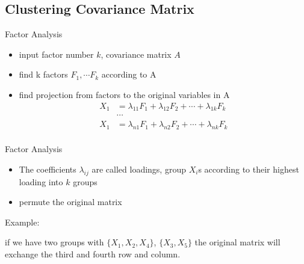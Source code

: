 \documentclass[bigger]{beamer}
\begin{document}
\subsection{Clustering Covariance Matrix}
\begin{frame}[label=sec-5-2-1]{Factor Analysis}
	\label{sec-5-2-1}
	\begin{itemize}
		\item input factor number $k$, covariance matrix $A$
		\item find k factors $F_1, \cdots F_k$ according to A 
		\item find projection from factors to the original variables in A
		\begin{align*}
		X_1&=\lambda_{11}F_1 + \lambda_{12}F_2+\cdots+\lambda_{1k}F_k\\
		&\cdots\\
		X_1&=\lambda_{n1}F_1 + \lambda_{n2}F_2+\cdots+\lambda_{nk}F_k\\
		\end{align*}	
	\end{itemize}
\end{frame}
\begin{frame}[label=sec-5-2-1]{Factor Analysis}
\begin{itemize}
	\item The coefficients $\lambda_{ij}$ are called loadings, group $X_i$s according to their highest loading into $k$ groups
	\item permute the original matrix
\end{itemize}
	Example:
	
	if we have two groups with $\{X_1, X_2, X_4\}$, $\{X_3, X_5 \}$ the original matrix will exchange the third and fourth row and column.
\end{frame}
\end{document}
